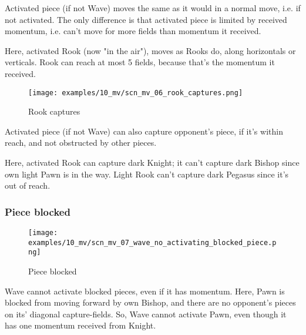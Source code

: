 Activated piece (if not Wave) moves the same as it would in a normal move, i.e. if
not activated. The only difference is that activated piece is limited by received
momentum, i.e. can't move for more fields than momentum it received.

Here, activated Rook (now "in the air"), moves as Rooks do, along horizontals or
verticals. Rook can reach at most 5 fields, because that's the momentum it received.

\clearpage %

\vspace*{-2.1\baselineskip}
\noindent
\begin{figure}[!h]
\texttt{[image: examples/10\_mv/scn\_mv\_06\_rook\_captures.png]}
\caption{Rook captures}
\label{fig:scn_mv_06_rook_captures}
\end{figure}

Activated piece (if not Wave) can also capture opponent's piece, if it's within reach,
and not obstructed by other pieces.

Here, activated Rook can capture dark Knight; it can't capture dark Bishop since
own light Pawn is in the way. Light Rook can't capture dark Pegasus since it's out
of reach.

\clearpage %

\subsubsection*{Piece blocked}

\vspace*{-3.0ex}
\noindent
\begin{figure}[h]
\texttt{[image: examples/10\_mv/scn\_mv\_07\_wave\_no\_activating\_blocked\_piece.png]}
\caption{Piece blocked}
\label{fig:scn_mv_07_wave_no_activating_blocked_piece}
\end{figure}

Wave cannot activate blocked pieces, even if it has momentum. Here, Pawn is blocked
from moving forward by own Bishop, and there are no opponent's pieces on its'
diagonal capture-fields. So, Wave cannot activate Pawn, even though it has one
momentum received from Knight.



